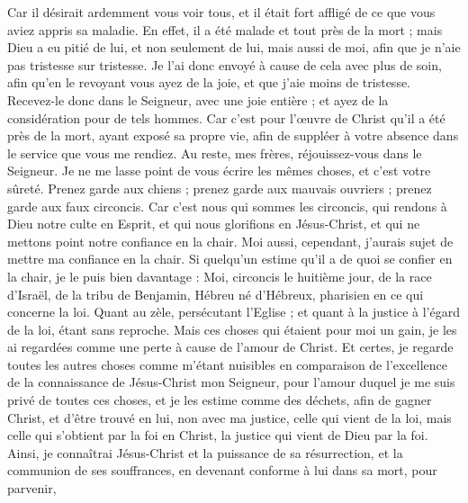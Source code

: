 \begin{multicols}{2}
Car il désirait ardemment vous voir tous, et il était fort affligé de ce que vous aviez appris sa maladie.
En effet, il a été malade et tout près de la mort ; mais Dieu a eu pitié de lui, et non seulement de lui, mais aussi de moi, afin que je n’aie pas tristesse sur tristesse.
Je l'ai donc envoyé à cause de cela avec plus de soin, afin qu'en le revoyant vous ayez de la joie, et que j'aie moins de tristesse.
Recevez-le donc dans le Seigneur, avec une joie entière ; et ayez de la considération pour de tels hommes.
Car c’est pour l’œuvre de Christ qu’il a été près de la mort, ayant exposé sa propre vie, afin de suppléer à votre absence dans le service que vous me rendiez.
\VerseOne{}Au reste, mes frères, réjouissez-vous dans le Seigneur. Je ne me lasse point de vous écrire les mêmes choses, et c’est votre sûreté.
Prenez garde aux chiens ; prenez garde aux mauvais ouvriers ; prenez garde aux faux circoncis.
Car c'est nous qui sommes les circoncis, qui rendons à Dieu notre culte en Esprit, et qui nous glorifions en Jésus-Christ, et qui ne mettons point notre confiance en la chair.
Moi aussi, cependant, j’aurais sujet de mettre ma confiance en la chair. Si quelqu'un estime qu'il a de quoi se confier en la chair, je le puis bien davantage :
Moi, circoncis le huitième jour, de la race d'Israël, de la tribu de Benjamin, Hébreu né d'Hébreux, pharisien en ce qui concerne la loi.
Quant au zèle, persécutant l'Eglise ; et quant à la justice à l’égard de la loi, étant sans reproche.
Mais ces choses qui étaient pour moi un gain, je les ai regardées comme une perte à cause de l'amour de Christ.
Et certes, je regarde toutes les autres choses comme m'étant nuisibles en comparaison de l'excellence de la connaissance de Jésus-Christ mon Seigneur, pour l'amour duquel je me suis privé de toutes ces choses, et je les estime comme des déchets, afin de gagner Christ,
et d’être trouvé en lui, non avec ma justice, celle qui vient de la loi, mais celle qui s’obtient par la foi en Christ, la justice qui vient de Dieu par la foi.
Ainsi, je connaîtrai Jésus-Christ et la puissance de sa résurrection, et la communion de ses souffrances, en devenant conforme à lui dans sa mort, pour parvenir,

\end{multicols}
